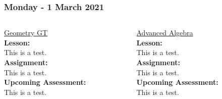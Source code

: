 \documentclass[handout]{beamer}
\begin{document}
\begin{frame}
	\frametitle{Monday - 1 March 2021} %
	\begin{columns}
		\begin{column}{0.48\textwidth}
			\underline{Geometry GT}\\
			\textbf{Lesson:}\\ %
			This is a test.
			\\ \vspace{5mm}
			\textbf{Assignment:}\\ %
			This is a test.
			\\ \vspace{5mm}
			\textbf{Upcoming Assessment:}\\ %
			This is a test.
		\end{column}
		\begin{column}{0.48\textwidth}
			\underline{Advanced Algebra}\\
			\textbf{Lesson:}\\ %
			This is a test.
			\\ \vspace{5mm}
			\textbf{Assignment:}\\ %
			This is a test.
			\\ \vspace{5mm}
			\textbf{Upcoming Assessment:}\\ %
			This is a test.
		\end{column}
	\end{columns}
\end{frame}
\end{document}

